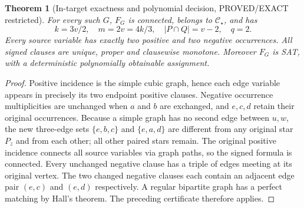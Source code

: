 \documentclass[11pt]{article}
\newtheorem{theorem}{Theorem}
\newcommand{\CS}{\mathcal C_\star}
\begin{document}
\begin{theorem}[In-target exactness and polynomial decision, PROVED/EXACT restricted]
For every such $G$, $F_G$ is connected, belongs to $\CS$, and has
\[
k=3v/2,\quad m=2v=4k/3,\quad
|P\cap Q|=v-2,\quad q=2.
\]
Every source variable has exactly two positive and two negative occurrences. All signed clauses are unique, proper and clausewise monotone. Moreover $F_G$ is SAT, with a deterministic polynomially obtainable assignment.
\end{theorem}
\begin{proof}
Positive incidence is the simple cubic graph, hence each edge variable appears in precisely its two endpoint positive clauses. Negative occurrence multiplicities are unchanged when $a$ and $b$ are exchanged, and $e,c,d$ retain their original occurrences. Because a simple graph has no second edge between $u,w$, the new three-edge sets $\{e,b,c\}$ and $\{e,a,d\}$ are different from any original star $P_z$ and from each other; all other paired stars remain. The original positive incidence connects all source variables via graph paths, so the signed formula is connected. Every unchanged negative clause has a triple of edges meeting at its original vertex. The two changed negative clauses each contain an adjacent edge pair $(e,c)$ and $(e,d)$ respectively. A regular bipartite graph has a perfect matching by Hall's theorem. The preceding certificate therefore applies.
\end{proof}
\end{document}
